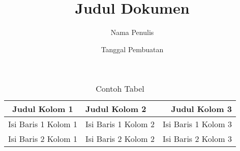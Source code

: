 \documentclass [a4paper,12pt] {report}
\begin{document}
\title{Judul Dokumen}
\author{Nama Penulis}
\date{Tanggal Pembuatan}


\begin{table}[htbp]
\begin{center}
\begin{tabular}{|c|l|r|}
\hline
	Judul Kolom 1 & Judul Kolom 2 & Judul Kolom 3 \\
\hline
	Isi Baris 1 Kolom 1 & Isi Baris 1 Kolom 2 & Isi Baris 1 Kolom 3 \\
	Isi Baris 2 Kolom 1 & Isi Baris 2 Kolom 2 & Isi Baris 2 Kolom 3 \\
\hline
\end{tabular}
\caption{Contoh Tabel}
\end{center}
\end{table}
\end{document}
